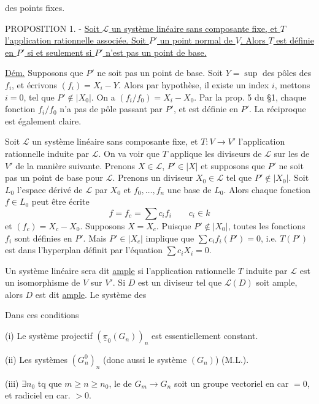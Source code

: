 
des points fixes.

PROPOSITION 1. - \uline{Soit $\mathcal{L}$ un système linéaire sans composante fixe, et $T$ l'application rationnelle associée. Soit $P'$ un point normal de $V$. Alors $T$ est définie en $P'$ si et seulement si $P'$ n'est pas un point de base.}

\uline{Dém.} Supposons que $P'$ ne soit pas un point de base. Soit $Y=\sup$ des pôles des $f_i$, et écrivons $(f_i)=X_i-Y$. Alors par hypothèse, il existe un index $i$, mettons $i=0$, tel que $P'\notin|X_0|$. On a $(f_i/f_0)=X_i-X_0$. Par la prop. 5 du \S 1, chaque fonction $f_i/f_0$ n'a pas de pôle passant par $P'$, et est définie en $P'$. La réciproque est également claire.

Soit $\mathcal{L}$ un système linéaire sans composante fixe, et $T:V\longrightarrow V'$ l'application rationnelle induite par $\mathcal{L}$. On va voir que $T$ applique les diviseurs de $\mathcal{L}$ sur les   de $V'$ de la manière suivante. Prenons $X\in\mathcal{L}$, $P'\in|X|$ et supposons que $P'$ ne soit pas un point de base pour $\mathcal{L}$. Prenons un diviseur $X_0\in\mathcal{L}$ tel que $P'\notin|X_0|$. Soit $L_0$ l'espace dérivé de $\mathcal{L}$ par $X_0$ et $f_0,\ldots,f_n$ une base de $L_0$. Alors chaque fonction $f\in L_0$ peut être écrite
\[
f=f_c=\sum c_i f_i\qquad c_i\in k
\]
et $(f_c)=X_c-X_0$. Supposons $X=X_c$. Puisque $P'\notin|X_0|$, toutes les fonctions $f_i$ sont définies en $P'$. Mais $P'\in|X_c|$ implique que $\sum c_i f_i(P')=0$, i.e. $T(P')$ est dans l'hyperplan définit par l'équation $\sum c_i X_i=0$.

Un système linéaire sera dit \uline{ample}  si l'application rationnelle $T$ induite par $\mathcal{L}$ est un isomorphisme de $V$ sur $V'$. Si $D$ est un diviseur tel que $\mathcal{L}(D)$ soit ample, alors $D$ est dit \uline{ample}. Le système des



Dans ces conditions

(i) Le système projectif $(\underline{\pi}_0(G_n))_n$ est essentiellement constant.

(ii) Les systèmes $(G_n^0)_n$ (donc aussi le système $(G_n)$)  (M.L.).

(iii)   $\exists n_0$ tq  que  $m\geq n\geq n_0$, le  de $G_m\longrightarrow G_n$ soit un groupe vectoriel  en car $=0$, et  radiciel en car. $>0$.

